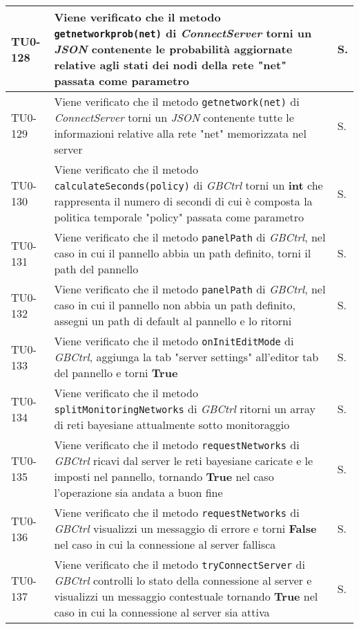\begin{longtable}{|C{.15\textwidth}|m{.66\textwidth}|C{.10\textwidth}|}
\hline
TU0-128 & Viene verificato che il metodo \texttt{getnetworkprob(net)} di \textit{ConnectServer} torni un \textit{JSON} contenente le probabilità aggiornate relative agli stati dei nodi della rete "net" passata come parametro & S.\\
\hline
{}TU0-129 & Viene verificato che il metodo \texttt{getnetwork(net)} di \textit{ConnectServer} torni un \textit{JSON} contenente tutte le informazioni relative alla rete "net" memorizzata nel server & S.\\
\hline
TU0-130 & Viene verificato che il metodo \texttt{calculateSeconds(policy)} di \textit{GBCtrl} torni un \textbf{int} che rappresenta il numero di secondi di cui è composta la politica temporale "policy" passata come parametro & S.\\
\hline
{}TU0-131 & Viene verificato che il metodo \texttt{panelPath} di \textit{GBCtrl}, nel caso in cui il pannello abbia un path definito, torni il path del pannello & S.\\
\hline
TU0-132 & Viene verificato che il metodo \texttt{panelPath} di \textit{GBCtrl}, nel caso in cui il pannello non abbia un path definito, assegni un path di default al pannello e lo ritorni & S.\\
\hline
{}TU0-133 & Viene verificato che il metodo \texttt{onInitEditMode} di \textit{GBCtrl}, aggiunga la tab "server settings" all'editor tab del pannello e torni \textbf{True} & S.\\
\hline
TU0-134 & Viene verificato che il metodo \texttt{splitMonitoringNetworks} di \textit{GBCtrl} ritorni un array di reti bayesiane attualmente sotto monitoraggio & S.\\
\hline
{}TU0-135 & Viene verificato che il metodo \texttt{requestNetworks} di \textit{GBCtrl} ricavi dal server le reti bayesiane caricate e le imposti nel pannello, tornando \textbf{True} nel caso l'operazione sia andata  a buon fine & S.\\
\hline
TU0-136 & Viene verificato che il metodo \texttt{requestNetworks} di \textit{GBCtrl} visualizzi un messaggio di errore e torni \textbf{False} nel caso in cui la connessione al server fallisca & S.\\
\hline
{}TU0-137 & Viene verificato che il metodo \texttt{tryConnectServer} di \textit{GBCtrl} controlli lo stato della connessione al server e visualizzi un messaggio contestuale tornando \textbf{True} nel caso in cui la connessione al server sia attiva & S.\\

\end{longtable}
